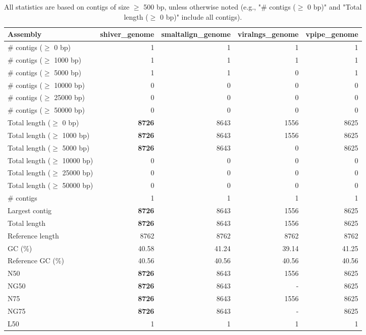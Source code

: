 \documentclass[12pt,a4paper]{article}
\begin{document}
\begin{table}[ht]
\begin{center}
\caption{All statistics are based on contigs of size $\geq$ 500 bp, unless otherwise noted (e.g., "\# contigs ($\geq$ 0 bp)" and "Total length ($\geq$ 0 bp)" include all contigs).}
\begin{tabular}{|l*{4}{|r}|}
\hline
Assembly & shiver\_genome & smaltalign\_genome & viralngs\_genome & vpipe\_genome \\ \hline
\# contigs ($\geq$ 0 bp) & 1 & 1 & 1 & 1 \\ \hline
\# contigs ($\geq$ 1000 bp) & 1 & 1 & 1 & 1 \\ \hline
\# contigs ($\geq$ 5000 bp) & 1 & 1 & 0 & 1 \\ \hline
\# contigs ($\geq$ 10000 bp) & 0 & 0 & 0 & 0 \\ \hline
\# contigs ($\geq$ 25000 bp) & 0 & 0 & 0 & 0 \\ \hline
\# contigs ($\geq$ 50000 bp) & 0 & 0 & 0 & 0 \\ \hline
Total length ($\geq$ 0 bp) & {\bf 8726} & 8643 & 1556 & 8625 \\ \hline
Total length ($\geq$ 1000 bp) & {\bf 8726} & 8643 & 1556 & 8625 \\ \hline
Total length ($\geq$ 5000 bp) & {\bf 8726} & 8643 & 0 & 8625 \\ \hline
Total length ($\geq$ 10000 bp) & 0 & 0 & 0 & 0 \\ \hline
Total length ($\geq$ 25000 bp) & 0 & 0 & 0 & 0 \\ \hline
Total length ($\geq$ 50000 bp) & 0 & 0 & 0 & 0 \\ \hline
\# contigs & 1 & 1 & 1 & 1 \\ \hline
Largest contig & {\bf 8726} & 8643 & 1556 & 8625 \\ \hline
Total length & {\bf 8726} & 8643 & 1556 & 8625 \\ \hline
Reference length & 8762 & 8762 & 8762 & 8762 \\ \hline
GC (\%) & 40.58 & 41.24 & 39.14 & 41.25 \\ \hline
Reference GC (\%) & 40.56 & 40.56 & 40.56 & 40.56 \\ \hline
N50 & {\bf 8726} & 8643 & 1556 & 8625 \\ \hline
NG50 & {\bf 8726} & 8643 & - & 8625 \\ \hline
N75 & {\bf 8726} & 8643 & 1556 & 8625 \\ \hline
NG75 & {\bf 8726} & 8643 & - & 8625 \\ \hline
L50 & 1 & 1 & 1 & 1 \\ \hline

\end{tabular}
\end{center}
\end{table}
\end{document}
